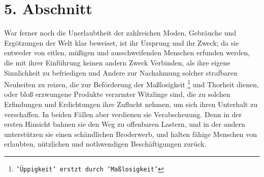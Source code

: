 \section{5. Abschnitt} \label{kap17_ab5}

War ferner noch die Unerlaubtheit der zahlreichen Moden, Gebräuche und
Ergötzungen der Welt klar beweiset, ist ihr Ursprung und ihr Zweck; da sie
entweder von eitlen, müßigen und ausschweifenden Menschen erfunden werden, die
mit ihrer Einführung keinen andern Zweck Verbinden, als ihre eigene Sinnlichkeit
zu befriedigen und Andere zur Nachahmung solcher strafbaren Neuheiten zu reizen,
die zur Beförderung der Maßlosigkeit
\footnote{\texttt{'Üppigkeit' erstzt durch 'Maßlosigkeit'}} und Thorheit dienen,
oder bloß erzwungene
Produkte verarmter Witzlinge sind, die zu solchen Erfindungen und Erdichtungen
ihre Zuflucht nehmen, um sich ihren Unterhalt zu verschaffen. In beiden Fällen
aber verdienen sie Verabscheuung. Denn in der ersten Hinsicht bahnen sie den Weg
zu offenbaren Lastern, und in der andern unterstützen sie einen schändlichen
Broderwerb, und halten fähige Menschen von erlaubten,
nützlichen und
nothwendigen Beschäftigungen zurück.

\medskip

